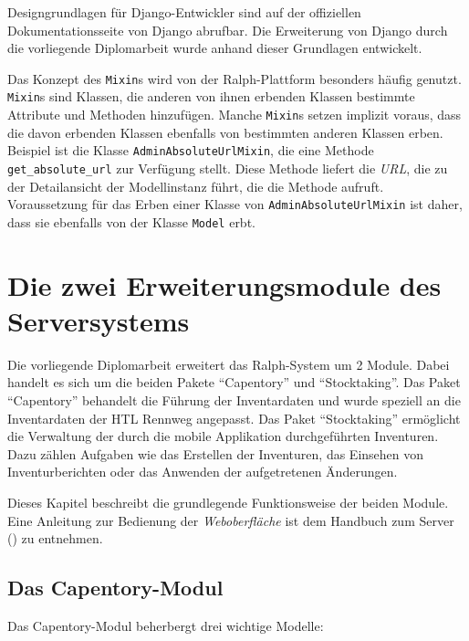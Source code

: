 Designgrundlagen für Django-Entwickler sind auf der offiziellen
Dokumentationsseite von Django \cite{django-doku-coding-style} abrufbar.
Die Erweiterung von Django durch die vorliegende Diplomarbeit wurde
anhand dieser Grundlagen entwickelt.

Das Konzept des \texttt{Mixin}s wird von der Ralph-Plattform besonders
häufig genutzt. \texttt{Mixin}s sind Klassen, die anderen von ihnen
erbenden Klassen bestimmte Attribute und Methoden hinzufügen. Manche
\texttt{Mixin}s setzen implizit voraus, dass die davon erbenden Klassen
ebenfalls von bestimmten anderen Klassen erben. Beispiel ist die Klasse
\texttt{AdminAbsoluteUrlMixin}, die eine Methode
\texttt{get\_absolute\_url} zur Verfügung stellt. Diese Methode liefert
die \emph{URL}, die zu
der Detailansicht der Modellinstanz führt, die die Methode aufruft.
Voraussetzung für das Erben einer Klasse von
\texttt{AdminAbsoluteUrlMixin} ist daher, dass sie ebenfalls von der
Klasse \texttt{Model} erbt.

\chapter{Die zwei Erweiterungsmodule des Serversystems}

Die vorliegende Diplomarbeit erweitert das Ralph-System um 2 Module.
Dabei handelt es sich um die beiden Pakete ``Capentory'' und
``Stocktaking''. Das Paket ``Capentory'' behandelt die Führung der
Inventardaten und wurde speziell an die Inventardaten der HTL Rennweg
angepasst. Das Paket ``Stocktaking'' ermöglicht die Verwaltung der durch
die mobile Applikation durchgeführten Inventuren. Dazu zählen Aufgaben
wie das Erstellen der Inventuren, das Einsehen von Inventurberichten
oder das Anwenden der aufgetretenen Änderungen.

Dieses Kapitel beschreibt die grundlegende Funktionsweise der beiden
Module. Eine Anleitung zur Bedienung der \emph{Weboberfläche}
ist dem Handbuch zum Server () zu entnehmen.

\hypertarget{das-capentory-modul}{%
\section{Das Capentory-Modul}\label{das-capentory-modul}}

Das Capentory-Modul beherbergt drei wichtige Modelle:

